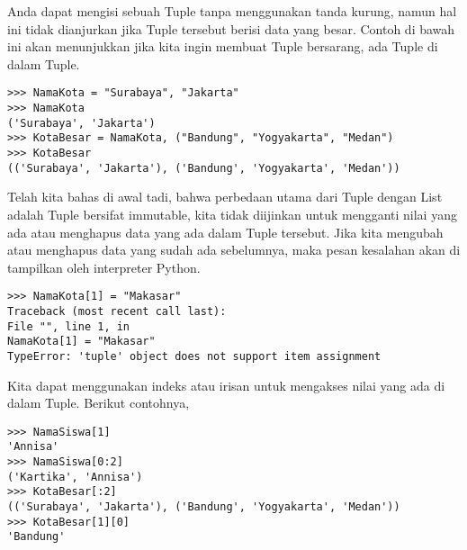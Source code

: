 Anda dapat mengisi sebuah Tuple tanpa menggunakan tanda kurung, namun hal ini tidak dianjurkan jika Tuple tersebut berisi data yang besar. Contoh di bawah ini akan menunjukkan jika kita ingin membuat Tuple bersarang, ada Tuple di dalam Tuple.
\begin{verbatim}
>>> NamaKota = "Surabaya", "Jakarta"
>>> NamaKota
('Surabaya', 'Jakarta')
>>> KotaBesar = NamaKota, ("Bandung", "Yogyakarta", "Medan")
>>> KotaBesar
(('Surabaya', 'Jakarta'), ('Bandung', 'Yogyakarta', 'Medan'))
\end{verbatim}

Telah kita bahas di awal tadi, bahwa perbedaan utama dari Tuple dengan List adalah Tuple bersifat immutable, kita tidak diijinkan untuk mengganti nilai yang ada atau menghapus data yang ada dalam Tuple tersebut. Jika kita mengubah atau menghapus data yang sudah ada sebelumnya, maka pesan kesalahan akan di tampilkan oleh interpreter Python.
\begin{verbatim}
>>> NamaKota[1] = "Makasar"
Traceback (most recent call last):
File "", line 1, in
NamaKota[1] = "Makasar"
TypeError: 'tuple' object does not support item assignment
\end{verbatim}

Kita dapat menggunakan indeks atau irisan untuk mengakses nilai yang ada di dalam Tuple. Berikut contohnya,
\begin{verbatim}
>>> NamaSiswa[1]
'Annisa'
>>> NamaSiswa[0:2]
('Kartika', 'Annisa')
>>> KotaBesar[:2]
(('Surabaya', 'Jakarta'), ('Bandung', 'Yogyakarta', 'Medan'))
>>> KotaBesar[1][0]
'Bandung'
\end{verbatim}

